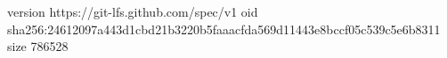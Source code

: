 version https://git-lfs.github.com/spec/v1
oid sha256:24612097a443d1cbd21b3220b5faaacfda569d11443e8bccf05c539c5e6b8311
size 786528
